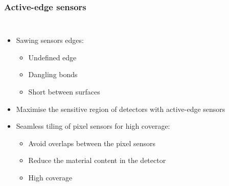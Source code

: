 \begin{frame}
  \frametitle{Active-edge sensors}

  \begin{columns}

    \begin{itemize}
    \item Sawing sensors edges:
      \begin{itemize}
      \item Undefined edge
      \item Dangling bonds
      \item Short between surfaces
      \end{itemize}
    \item Maximise the sensitive region of detectors with active-edge
      sensors
    \item Seamless tiling of pixel sensors for high coverage:
      \begin{itemize}
      \item Avoid overlaps between the pixel sensors
      \item Reduce the material content in the detector
      \item High coverage
      \end{itemize}
    \end{itemize}

    \vspace{-0.8cm}
\end{columns}
\end{frame}
